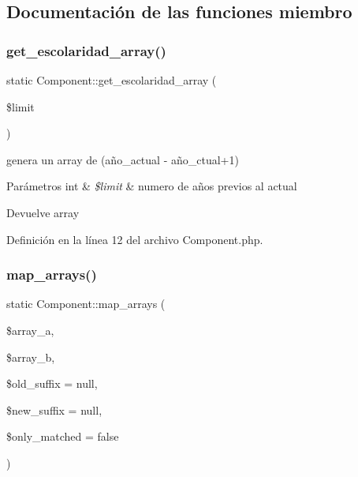 \subsection{Documentación de las funciones miembro}
\mbox{\label{class_component_ae064083382c242e7e97acc9295e594a1}} 
\subsubsection{\texorpdfstring{get\_escolaridad\_array()}{get\_escolaridad\_array()}}
{\footnotesize\ttfamily static Component\+::get\+\_\+escolaridad\+\_\+array (\begin{DoxyParamCaption}\item[{}]{\$limit }\end{DoxyParamCaption})\hspace{0.3cm}{\ttfamily [static]}}

genera un array de (año\+\_\+actual -\/ año\+\_\+ctual+1)


\begin{DoxyParams}[1]{Parámetros}
int & {\em \$limit} & numero de años previos al actual \\
\hline
\end{DoxyParams}
\begin{DoxyReturn}{Devuelve}
array 
\end{DoxyReturn}


Definición en la línea 12 del archivo Component.\+php.

\mbox{\label{class_component_af653678b68f3c0a105ee403a242c2958}} 
\subsubsection{\texorpdfstring{map\_arrays()}{map\_arrays()}}
{\footnotesize\ttfamily static Component\+::map\+\_\+arrays (\begin{DoxyParamCaption}\item[{}]{\$array\+\_\+a,  }\item[{}]{\$array\+\_\+b,  }\item[{}]{\$old\+\_\+suffix = {\ttfamily null},  }\item[{}]{\$new\+\_\+suffix = {\ttfamily null},  }\item[{}]{\$only\+\_\+matched = {\ttfamily false} }\end{DoxyParamCaption})\hspace{0.3cm}{\ttfamily [static]}}

